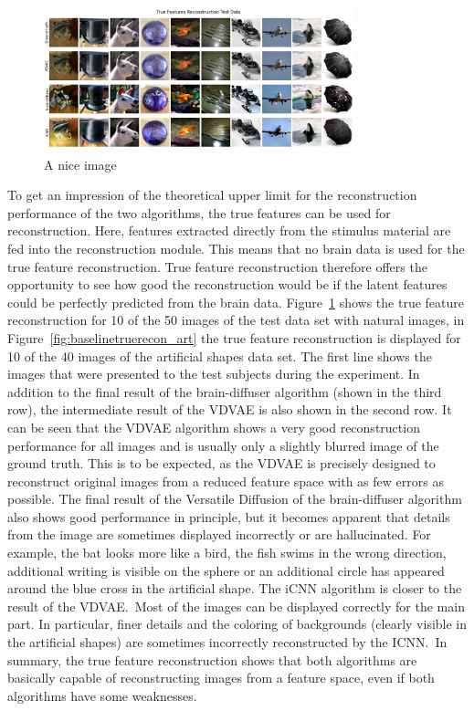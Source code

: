 \begin{figure}[ht]
    \centering
    \includegraphics[width=0.8\textwidth]{plots/baseline_true_recon_test.JPEG}
    \caption{A nice image}\label{fig:baselinetruerecon}
\end{figure}
To get an impression of the theoretical upper limit for the reconstruction performance of the two algorithms, the true features can be used for reconstruction. Here, features extracted directly from the stimulus material are fed into the reconstruction module. This means that no brain data is used for the true feature reconstruction. True feature reconstruction therefore offers the opportunity to see how good the reconstruction would be if the latent features could be perfectly predicted from the brain data. Figure~\ref{fig:baselinetruerecon} shows the true feature reconstruction for 10 of the 50 images of the test data set with natural images, in Figure~\ref{fig:baselinetruerecon_art} the true feature reconstruction is displayed for 10 of the 40 images of the artificial shapes data set. The first line shows the images that were presented to the test subjects during the experiment. In addition to the final result of the brain-diffuser algorithm (shown in the third row), the intermediate result of the VDVAE is also shown in the second row. It can be seen that the VDVAE algorithm shows a very good reconstruction performance for all images and is usually only a slightly blurred image of the ground truth. This is to be expected, as the VDVAE is precisely designed to reconstruct original images from a reduced feature space with as few errors as possible. The final result of the Versatile Diffusion of the brain-diffuser algorithm also shows good performance in principle, but it becomes apparent that details from the image are sometimes displayed incorrectly or are hallucinated. For example, the bat looks more like a bird, the fish swims in the wrong direction, additional writing is visible on the sphere or an additional circle has appeared around the blue cross in the artificial shape. The iCNN algorithm is closer to the result of the VDVAE.\ Most of the images can be displayed correctly for the main part. In particular, finer details and the coloring of backgrounds (clearly visible in the artificial shapes) are sometimes incorrectly reconstructed by the ICNN.\ In summary, the true feature reconstruction shows that both algorithms are basically capable of reconstructing images from a feature space, even if both algorithms have some weaknesses.



